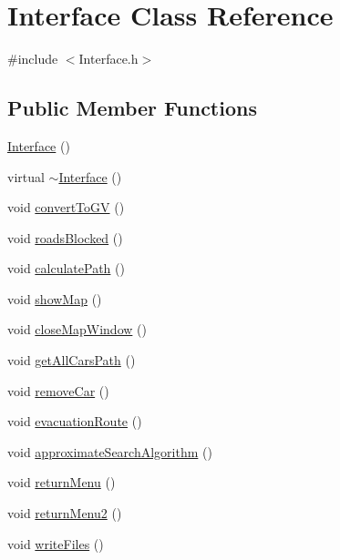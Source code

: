 \hypertarget{class_interface}{}\section{Interface Class Reference}
\label{class_interface}


{\ttfamily \#include $<$Interface.\+h$>$}

\subsection*{Public Member Functions}
\begin{DoxyCompactItemize}
\item 
\mbox{\hyperlink{class_interface_a4406d74c75bdfe150bf72be1f1cda8b1}{Interface}} ()
\item 
virtual \mbox{\hyperlink{class_interface_a19179888f29f18f1be54a3dfe98f68c0}{$\sim$\+Interface}} ()
\item 
void \mbox{\hyperlink{class_interface_a04428812c5138654aaed3c17bc8f7deb}{convert\+To\+GV}} ()
\item 
void \mbox{\hyperlink{class_interface_a8b09945f62fc12fb90de30046042efe3}{roads\+Blocked}} ()
\item 
void \mbox{\hyperlink{class_interface_ae4cad587f14fd078f118858ef2f73015}{calculate\+Path}} ()
\item 
void \mbox{\hyperlink{class_interface_aec46d793b0a3ac1196dd61df896e154a}{show\+Map}} ()
\item 
void \mbox{\hyperlink{class_interface_a3afcfe1089d52a1359602dca26611657}{close\+Map\+Window}} ()
\item 
void \mbox{\hyperlink{class_interface_a3e043e9aa51fa1e16436d1a3247a9daa}{get\+All\+Cars\+Path}} ()
\item 
void \mbox{\hyperlink{class_interface_a2bbf8267df70e1aa4a225ab4ca17ff66}{remove\+Car}} ()
\item 
void \mbox{\hyperlink{class_interface_ab465fb7313b88d389af87d713b27d2ba}{evacuation\+Route}} ()
\item 
void \mbox{\hyperlink{class_interface_a12b0f4dba3448926ac90f2f0ca6ad5b6}{approximate\+Search\+Algorithm}} ()
\item 
void \mbox{\hyperlink{class_interface_ac9d3a7f7dd91e5684e988942d1e62c6f}{return\+Menu}} ()
\item 
void \mbox{\hyperlink{class_interface_a7b37d708a88660698fc79f0e7bbedb95}{return\+Menu2}} ()
\item 
void \mbox{\hyperlink{class_interface_afa0a2e9fbced7c9451e2a3cddcd39d6a}{write\+Files}} ()
\end{DoxyCompactItemize}
